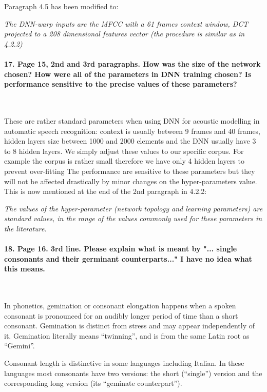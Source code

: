 \documentclass[]{article}
\begin{document}
Paragraph 4.5 has been modified to:

\textit{The DNN-warp inputs are the MFCC with a 61 frames context window, DCT projected to a 208 dimensional features vector (the procedure is similar as in 4.2.2)}

\paragraph{17. Page 15, 2nd and 3rd paragraphs. How was the size of the network chosen? How were all of the parameters in DNN training chosen? Is performance sensitive to the precise values of these parameters?}

~

These are rather standard parameters when using DNN for acoustic modelling in automatic speech recognition: context is usually between 9 frames and 40 frames, hidden layers size between 1000 and 2000 elements and the DNN usually have 3 to 8 hidden layers. We simply adjust these values to our specific corpus. For example the corpus is rather small therefore we have only 4 hidden layers to prevent over-fitting The performance are sensitive to these parameters but they will not be affected drastically by minor changes on the hyper-parameters value. This is now mentioned at the end of the 2nd paragraph in 4.2.2:

\textit{The values of the hyper-parameter (network topology and learning parameters) are standard values, in the range of the values commonly used for these parameters in the literature.} 

\paragraph{18. Page 16. 3rd line. Please explain what is meant by "... single consonants and their germinant counterparts..." I have no idea what this means.}

~

In phonetics, gemination or consonant elongation happens when a spoken
consonant is  pronounced for an audibly  longer period of  time than a
short  consonant. Gemination is  distinct from  stress and  may appear
independently of  it. Gemination literally means  ``twinning'', and is
from the same Latin root as ``Gemini''.

Consonant length  is distinctive in some  languages including Italian.
In  these  languages most  consonants  have  two  versions: the  short
(``single'') version  and the corresponding long  version (its ``geminate                                                 
counterpart'').
\end{document}
